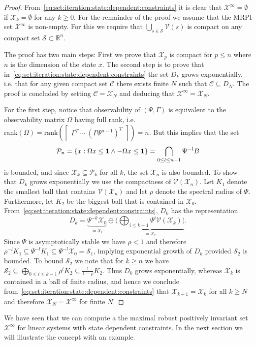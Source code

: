 \documentclass[letterpaper, 10pt, conference]{ieeeconf} %
\begin{document}
\begin{proof}
From~\eqref{eq:set:iteration:state:dependent:constraints} it is clear that $\mathcal X^\infty = \emptyset$ 
if $\mathcal X_k =\emptyset$ for any $k\geq 0$. For the remainder of the proof we assume that the MRPI set 
$\mathcal X^\infty$ is non-empty. For this we require that $\bigcup_{s\in\mathcal S}\mathcal V(s)$ is 
compact on any compact set $\mathcal S\subset\mathbb R^n$.

The proof has two main steps: First we prove that $\mathcal X_p$ is compact for $p\leq n$
where $n$ is the dimension of the state $x$. The second step is to prove that in~\eqref{eq:set:iteration:state:dependent:constraints}
the set $D_k$ grows exponentially, i.e. that for any given compact set $\mathcal C$ there exists
finite $N$ such that $\mathcal C\subseteq D_{N}$. The proof is concluded by setting 
$\mathcal C = \mathcal X_{N}$ and deducing that $\mathcal X^\infty = \mathcal X_N$. 

For the first step, notice that observability of $(\Psi,\Gamma)$ is equivalent to the observability matrix 
$\Omega$ having full rank, i.e.\ $\mathrm{rank}(\Omega) = \mathrm{rank}(\begin{bmatrix} \Gamma^T \ \cdots \ 
(\Gamma\Psi^{n-1})^T\end{bmatrix}) = n$.
But  this implies that the set 
%
\[
\mathcal P_{n} = \{x: 
\Omega x\leq{\bf{1}}\wedge-\Omega x\leq{\bf{1}}\} = \bigcap_{0\leq l\leq n-1} \Psi^{-l} B
\]
%
is bounded, and since $\mathcal X_k\subseteq \mathcal P_k$ for all $k$, 
the set $\mathcal X_{n}$ is also bounded. To show that $D_k$ grows exponentially we use the compactness 
of $\mathcal V(\mathcal X_{n})$. Let $K_1$ denote the smallest ball that contains $\mathcal V(\mathcal X_{n})$ and let
$\rho$ denote the spectral radius of $\Psi$. Furthermore, let $K_2$
be the biggest ball that is contained in $\mathcal X_{0}$. From~\eqref{eq:set:iteration:state:dependent:constraints}, 
$D_k$ has the representation
%
\begin{equation}
D_k = \underbrace{\Psi^{-k}\mathcal X_0}_{=\mathcal S_1} \ominus \underbrace{\biggl(\bigoplus_{i\leq k-1} 
\Psi^i\mathcal V(\mathcal X_k)\biggr)}_{=\mathcal S_2}.
\end{equation}
%
Since $\Psi$ is asymptotically stable we have $\rho<1$ and therefore $\rho^{-l}K_1\subseteq\Psi^{-l} K_1 
\subseteq \Psi^{-l}\mathcal X_0 = \mathcal S_1$, implying exponential growth of $D_k$ provided $\mathcal S_2$ 
is bounded. To bound $\mathcal S_2$ we note that for $k\geq n$ we have $\mathcal S_2\subseteq 
\bigoplus_{0\leq i\leq k-1} \rho^i K_2 \subseteq \frac{1}{1-\rho} K_2$. Thus $D_k$ grows exponentially, whereas 
$\mathcal X_k$ is contained in a ball of finite radius, and hence we conclude from~\eqref{eq:set:iteration:state:dependent:constraints} that 
$\mathcal X_{k+1} = \mathcal X _k$ for all $k\geq N$ and therefore $\mathcal X _N = \mathcal X^\infty$ for finite $N$.
\end{proof}
%
We have seen that we can compute a the maximal robust positively invariant set $\mathcal X^\infty$ for linear 
systems with state dependent constraints. In the next section we will illustrate the concept with an 
example.
%
%
%
\end{document}
